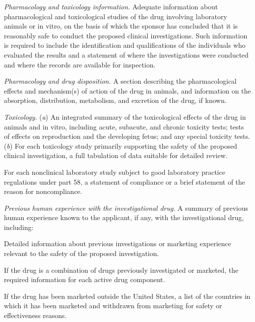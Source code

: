 \documentclass[11pt]{article}
\begin{document}
\begin{description}[leftmargin=0.5cm,style=sameline]
\item[(8)] \textit{Pharmacology and toxicology information.} Adequate information about pharmacological and toxicological studies of the drug involving laboratory animals or in vitro, on the basis of which the sponsor has concluded that it is reasonably safe to conduct the proposed clinical investigations. Such information is required to include the identification and qualifications of the individuals who evaluated the results and a statement of where the investigations were conducted and where the records are available for inspection.
\begin{description}[leftmargin=0.8cm,style=sameline]
\item[(i)] \textit{Pharmacology and drug disposition.} A section describing the pharmacological effects and mechanism(s) of action of the drug in animals, and information on the absorption, distribution, metabolism, and excretion of the drug, if known.
\item[(ii)] \textit{Toxicology.} (\textit{a}) An integrated summary of the toxicological effects of the drug in animals and in vitro, including acute, subacute, and chronic toxicity tests; tests of effects on reproduction and the developing fetus; and any special toxicity tests. (\textit{b}) For each toxicology study primarily supporting the safety of the proposed clinical investigation, a full tabulation of data suitable for detailed review.
\item[(iii)] For each nonclinical laboratory study subject to good laboratory practice regulations under part 58, a statement of compliance or a brief statement of the reason for noncompliance.
\end{description}

\item[(9)] \textit{Previous human experience with the investigational drug.} A summary of previous human experience known to the applicant, if any, with the investigational drug, including:
\begin{description}[leftmargin=0.8cm,style=sameline]
\item[(i)] Detailed information about previous investigations or marketing experience relevant to the safety of the proposed investigation.
\item[(ii)] If the drug is a combination of drugs previously investigated or marketed, the required information for each active drug component.
\item[(iii)] If the drug has been marketed outside the United States, a list of the countries in which it has been marketed and withdrawn from marketing for safety or effectiveness reasons.
\end{description}


\end{description}
\end{document}
